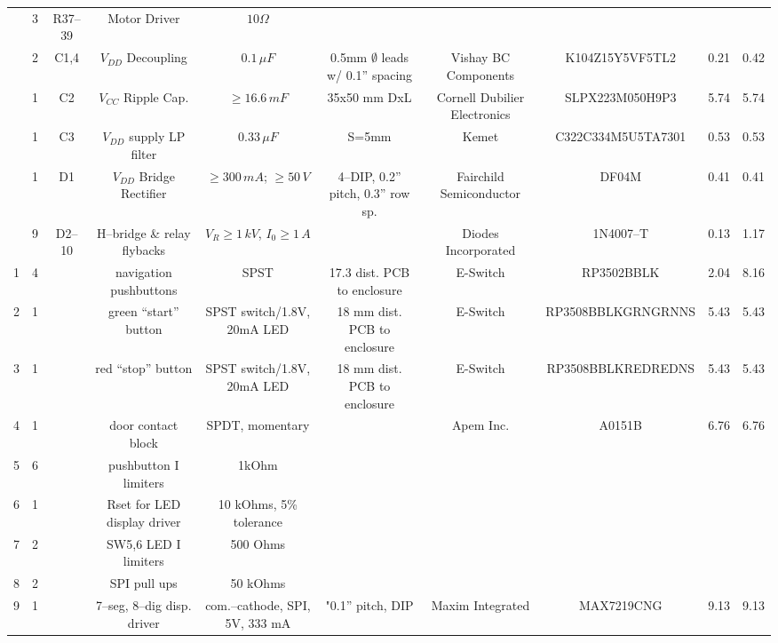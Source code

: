 \documentclass[10pt, twocolumn]{article}
\begin{document}
\begin{center}
\begin{adjustbox}{max width=\textwidth}
\begin{tabular}{c c c c c c c c c c}
	&3	&R37--39	&Motor Driver	&$10\Omega$		&
	&			&			&		&		\\

	&2	&C1,4		&$V_{DD}$ Decoupling	&$0.1\,\mu F$	&0.5mm $\emptyset$ leads w/ 0.1'' spacing
	&Vishay BC Components	&K104Z15Y5VF5TL2	&0.21		&0.42		\\

	&1	&C2		&$V_{CC}$ Ripple Cap.	&$\geq16.6\,mF$	&35x50 mm DxL		
	&Cornell Dubilier Electronics	&SLPX223M050H9P3	&5.74		&5.74	\\

	&1	&C3		&$V_{DD}$ supply LP filter	&$0.33\,\mu F$	&S=5mm		
	&Kemet			&C322C334M5U5TA7301	&0.53		&0.53		\\

	&1	&D1		&$V_{DD}$ Bridge Rectifier	&$\geq 300\,mA$; $\geq 50\,V$	&4--DIP, 0.2'' pitch, 0.3'' row sp.
	&Fairchild Semiconductor	&DF04M			&0.41		&0.41	\\

	&9	&D2--10	&H--bridge \& relay flybacks	&$V_{R}\geq1\,kV$, $I_{0}\geq 1\,A$	&
	&Diodes Incorporated	&1N4007--T		&0.13		&1.17	\\

1	&4	&	&navigation pushbuttons	&SPST				&17.3 dist. PCB to enclosure
	&E-Switch		&RP3502BBLK		&2.04		&8.16	\\

2	&1	&	&green “start” button	&SPST switch/1.8V, 20mA LED	&18 mm dist. PCB to enclosure
	&E-Switch		&RP3508BBLKGRNGRNNS	&5.43		&5.43	\\

3	&1	&	&red “stop” button	&SPST switch/1.8V, 20mA LED	&18 mm dist. PCB to enclosure
	&E-Switch		&RP3508BBLKREDREDNS	&5.43		&5.43	\\

4	&1	&	&door contact block	&SPDT, momentary		&
	&Apem Inc.		&A0151B			&6.76		&6.76	\\

5	&6	&	&pushbutton I limiters	&1kOhm				&
	&		&			&		&	\\

6	&1	&	&Rset for LED display driver	&10 kOhms, 5\% tolerance	&
	&		&			&		&	\\

7	&2	&	&SW5,6 LED I limiters	&500 Ohms			&
	&		&			&		&	\\

8	&2	&	&SPI pull ups		&50 kOhms			&
	&		&			&		&	\\

9	&1	&	&7--seg, 8--dig disp. driver	&com.--cathode, SPI, 5V, 333 mA	&"0.1” pitch, DIP
	&Maxim Integrated	&MAX7219CNG		&9.13		&9.13	\\


\end{tabular}
\end{adjustbox}
\end{center}
\end{document}
